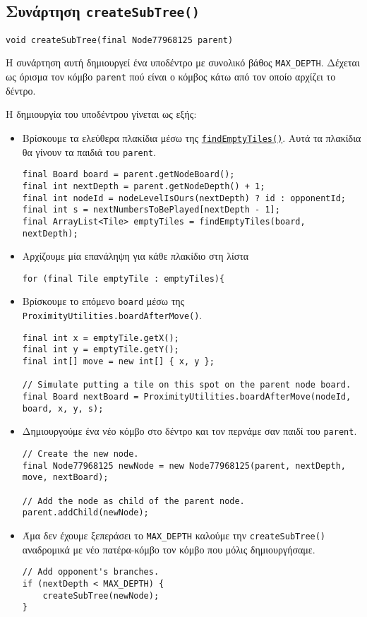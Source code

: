 \subsection{Συνάρτηση \texttt{createSubTree()}}
\begin{lstlisting}[style=declaration]
void createSubTree(final Node77968125 parent)
\end{lstlisting}
Η συνάρτηση αυτή δημιουργεί ένα υποδέντρο με συνολικό βάθος \lstinline!MAX_DEPTH!.
Δέχεται ως όρισμα τον κόμβο \lstinline!parent! πού είναι ο κόμβος κάτω από τον οποίο αρχίζει το δέντρο.

Η δημιουργία του υποδέντρου γίνεται ως εξής:
\begin{itemize}
\item Βρίσκουμε τα ελεύθερα πλακίδια μέσω της \hyperref[fun:findEmptyTiles]{\lstinline!findEmptyTiles()!}.
Αυτά τα πλακίδια θα γίνουν τα παιδιά του \lstinline!parent!.
\begin{lstlisting}[style=chunk]
final Board board = parent.getNodeBoard();
final int nextDepth = parent.getNodeDepth() + 1;
final int nodeId = nodeLevelIsOurs(nextDepth) ? id : opponentId;
final int s = nextNumbersToBePlayed[nextDepth - 1];
final ArrayList<Tile> emptyTiles = findEmptyTiles(board, nextDepth);
\end{lstlisting}

\item Αρχίζουμε μία επανάληψη για κάθε πλακίδιο στη λίστα
\begin{lstlisting}[style=chunk]
for (final Tile emptyTile : emptyTiles){
\end{lstlisting}

\item Βρίσκουμε το επόμενο \lstinline!board! μέσω της \lstinline!ProximityUtilities.boardAfterMove()!.
\begin{lstlisting}[style=chunk]
final int x = emptyTile.getX();
final int y = emptyTile.getY();
final int[] move = new int[] { x, y };

// Simulate putting a tile on this spot on the parent node board.
final Board nextBoard = ProximityUtilities.boardAfterMove(nodeId, board, x, y, s);
\end{lstlisting}

\item Δημιουργούμε ένα νέο κόμβο στο δέντρο και τον περνάμε σαν παιδί του \lstinline!parent!.
\begin{lstlisting}[style=chunk]
// Create the new node.
final Node77968125 newNode = new Node77968125(parent, nextDepth, move, nextBoard);

// Add the node as child of the parent node.
parent.addChild(newNode);
\end{lstlisting}

\item Άμα δεν έχουμε ξεπεράσει το \lstinline!MAX_DEPTH! καλούμε την \lstinline!createSubTree()! αναδρομικά με νέο πατέρα-κόμβο τον κόμβο που μόλις δημιουργήσαμε.
\begin{lstlisting}[style=chunk]
// Add opponent's branches.
if (nextDepth < MAX_DEPTH) {
    createSubTree(newNode);
}
\end{lstlisting}
\end{itemize}

